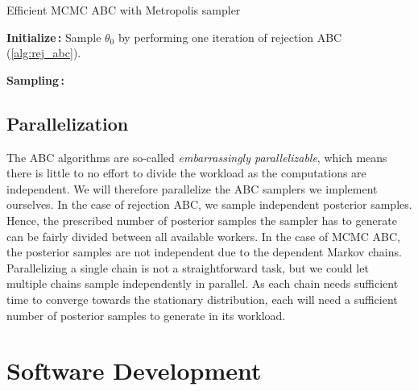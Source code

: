 \begin{algorithm}[!htb]
\caption{Efficient MCMC ABC with Metropolis sampler}
\label{alg:mcmcabc_efficient}
\SetAlgoLined
\DontPrintSemicolon
 \textbf{Initialize\,:}\;
 \nl Sample $\theta_0$ by performing one iteration of rejection ABC (\cref{alg:rej_abc}).\;

 \vspace{5mm}
 \textbf{Sampling\,:}\;
\end{algorithm}


\subsection{Parallelization}

The ABC algorithms are so-called \textit{embarrassingly parallelizable}, which means there is little to no effort to divide the workload as the computations are independent. We will therefore parallelize the ABC samplers we implement ourselves. In the case of rejection ABC, we sample independent posterior samples. Hence, the prescribed number of posterior samples the sampler has to generate can be fairly divided between all available workers. In the case of MCMC ABC, the posterior samples are not independent due to the dependent Markov chains. Parallelizing a single chain is not a straightforward task, but we could let multiple chains sample independently in parallel. As each chain needs sufficient time to converge towards the stationary distribution, each will need a sufficient number of posterior samples to generate in its workload.

\section{Software Development}\label{sec:software}


